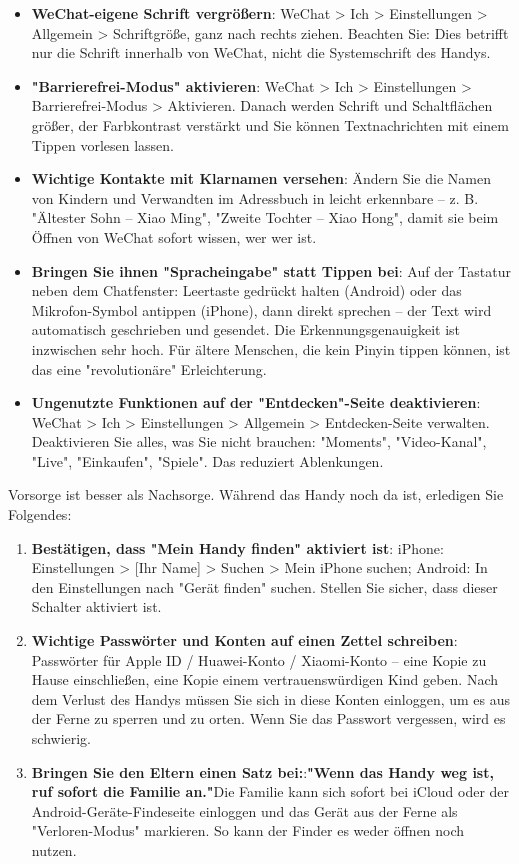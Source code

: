 \begin{itemize}
  \item \textbf{WeChat-eigene Schrift vergrößern}: WeChat > Ich > Einstellungen > Allgemein > Schriftgröße, ganz nach rechts ziehen. Beachten Sie: Dies betrifft nur die Schrift innerhalb von WeChat, nicht die Systemschrift des Handys.
  \item \textbf{"Barrierefrei-Modus" aktivieren}: WeChat > Ich > Einstellungen > Barrierefrei-Modus > Aktivieren. Danach werden Schrift und Schaltflächen größer, der Farbkontrast verstärkt und Sie können Textnachrichten mit einem Tippen vorlesen lassen.
  \item \textbf{Wichtige Kontakte mit Klarnamen versehen}: Ändern Sie die Namen von Kindern und Verwandten im Adressbuch in leicht erkennbare – z. B. "Ältester Sohn – Xiao Ming", "Zweite Tochter – Xiao Hong", damit sie beim Öffnen von WeChat sofort wissen, wer wer ist.
  \item \textbf{Bringen Sie ihnen "Spracheingabe" statt Tippen bei}: Auf der Tastatur neben dem Chatfenster: Leertaste gedrückt halten (Android) oder das Mikrofon-Symbol antippen (iPhone), dann direkt sprechen – der Text wird automatisch geschrieben und gesendet. Die Erkennungsgenauigkeit ist inzwischen sehr hoch. Für ältere Menschen, die kein Pinyin tippen können, ist das eine "revolutionäre" Erleichterung.
  \item \textbf{Ungenutzte Funktionen auf der "Entdecken"-Seite deaktivieren}: WeChat > Ich > Einstellungen > Allgemein > Entdecken-Seite verwalten. Deaktivieren Sie alles, was Sie nicht brauchen: "Moments", "Video-Kanal", "Live", "Einkaufen", "Spiele". Das reduziert Ablenkungen.
\end{itemize}


Vorsorge ist besser als Nachsorge. Während das Handy noch da ist, erledigen Sie Folgendes:

\begin{enumerate}
  \item \textbf{Bestätigen, dass "Mein Handy finden" aktiviert ist}: iPhone: Einstellungen > [Ihr Name] > Suchen > Mein iPhone suchen; Android: In den Einstellungen nach "Gerät finden" suchen. Stellen Sie sicher, dass dieser Schalter aktiviert ist.
  \item \textbf{Wichtige Passwörter und Konten auf einen Zettel schreiben}: Passwörter für Apple ID / Huawei-Konto / Xiaomi-Konto – eine Kopie zu Hause einschließen, eine Kopie einem vertrauenswürdigen Kind geben. Nach dem Verlust des Handys müssen Sie sich in diese Konten einloggen, um es aus der Ferne zu sperren und zu orten. Wenn Sie das Passwort vergessen, wird es schwierig.
  \item \textbf{Bringen Sie den Eltern einen Satz bei:}:\textbf{"Wenn das Handy weg ist, ruf sofort die Familie an."}Die Familie kann sich sofort bei iCloud oder der Android-Geräte-Findeseite einloggen und das Gerät aus der Ferne als "Verloren-Modus" markieren. So kann der Finder es weder öffnen noch nutzen.
\end{enumerate}

